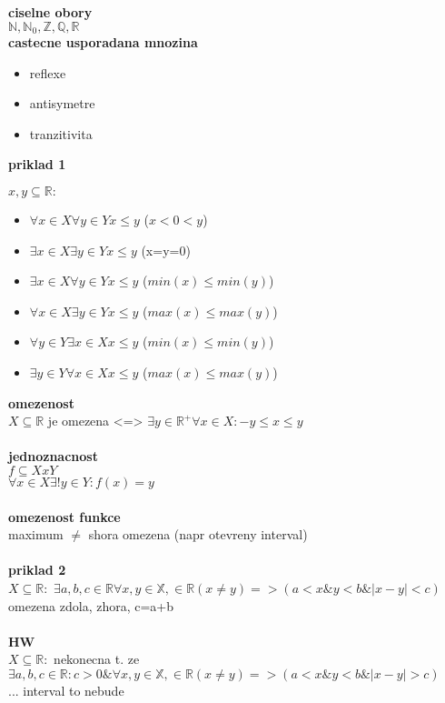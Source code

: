 \documentclass[a4paper]{article}
\begin{document}
\textbf{ciselne obory}\\
$\mathbb{N}, \mathbb{N}_0, \mathbb{Z}, \mathbb{Q}, \mathbb{R}$
\\
\textbf{castecne usporadana mnozina}\\
\begin{itemize}
    \item reflexe
    \item antisymetre
    \item tranzitivita
\end{itemize}

\textbf{priklad 1}

$x, y \subseteq \mathbb{R}: $
\begin{itemize}
    \item $\forall x \in X \forall y \in Y x \leq y$ ($x<0<y$)
    \item $\exists x \in X \exists y \in Y x \leq y$ (x=y=0)
    \item $\exists x \in X \forall y \in Y x \leq y$ ($min(x) \leq min(y)$) 
    \item $\forall x \in X \exists y \in Y x \leq y$ ($max(x) \leq max(y)$)
    \item $\forall y \in Y \exists x \in X x \leq y$ ($min(x) \leq min(y)$)
    \item $\exists y \in Y \forall x \in X x \leq y$ ($max(x) \leq max(y)$)
\end{itemize}

\textbf{omezenost}\\
$X\subseteq \mathbb{R}$
je omezena <=>
$\exists y \in \mathbb{R}^{+} \forall x \in X: -y \leq x \leq y$
\\\\
\textbf{jednoznacnost}\\
$f \subseteq XxY$ \\
$\forall x \in X \exists!y\in Y:f(x)=y$
\\\\
\textbf{omezenost funkce}\\
maximum $\neq$ shora omezena (napr otevreny interval)
\\\\
\textbf{priklad 2}\\
$X \subseteq \mathbb{R}:$
$\exists a,b,c \in \mathbb{R} \forall x,y \in \mathbb{X}, \in \mathbb{R} (x\neq y)
=> (a < x \& y<b \& |x-y|<c)$\\
omezena zdola, zhora, c=a+b
\\\\
\textbf{HW}\\
$X \subseteq \mathbb{R}:$ nekonecna t. ze\\
$\exists a,b,c \in \mathbb{R}: c>0 \& \forall x,y \in \mathbb{X}, \in \mathbb{R} (x\neq y)
=> (a < x \& y<b \& |x-y|>c)$\\
... interval to nebude
\end{document}
